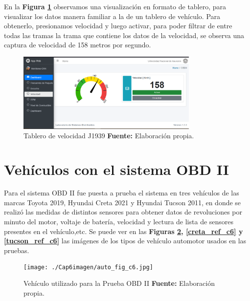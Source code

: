 En la \textbf{Figura \ref{gauge_ref_c6}} observamos una visualización en formato de tablero, para visualizar los datos manera familiar a la de un tablero de vehículo. 
Para obtenerlo, presionamos velocidad y luego activar, para poder filtrar de entre todas las tramas la trama que contiene los datos de la velocidad, se observa una captura de velocidad de 158 metros por segundo. 


\begin{figure}[H]
	\centering
	\includegraphics[width=0.8\textwidth]{./Cap6imagen/gauge_fig_c6.png}
	\caption [Tablero de Velocidad J1939.]{Tablero de velocidad J1939 \textbf{ Fuente:} %
		Elaboración propia.}
	\label{gauge_ref_c6} %
\end{figure}

\section{Vehículos con el sistema OBD II}

Para el sistema OBD II fue puesta a prueba el sistema en tres vehículos de las marcas Toyota 2019, Hyundai Creta 2021 y Hyundai Tucson 2011, en donde se realizó las medidas de distintos sensores para obtener datos de revoluciones por minuto del motor, voltaje de batería, velocidad y lectura de lista de sensores presentes en el vehículo,etc. Se puede ver en las \textbf{Figuras \ref{auto_ref_c6}, \ref{creta_ref_c6} y \ref{tucson_ref_c6} }  las imágenes de los tipos de vehículo automotor usados en las pruebas. 

\begin{figure}[H]
	\centering
	\texttt{[image: ./Cap6imagen/auto\_fig\_c6.jpg]}
	\caption [Vehículo utilizado para la Prueba OBD II.]{Vehículo utilizado para la Prueba OBD II \textbf{ Fuente:} %
		Elaboración propia.}
	\label{auto_ref_c6} %
\end{figure}

